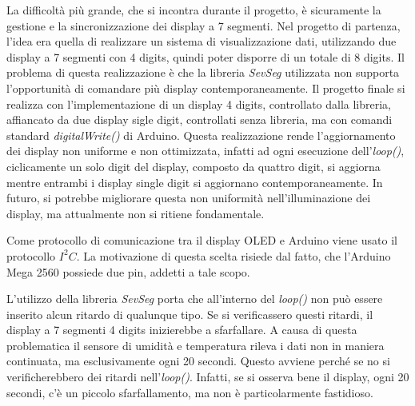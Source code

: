 \documentclass[paper=a4, fontsize=10pt]{scrartcl}
\begin{document}
La difficoltà più grande, che si incontra durante il progetto, è sicuramente la gestione e la sincronizzazione dei display a 7 segmenti. Nel progetto di partenza, l'idea era quella di realizzare un sistema di visualizzazione dati, utilizzando due display a 7 segmenti con 4 digits, quindi poter disporre di un totale di 8 digits. Il problema di questa realizzazione è che la libreria \textit{SevSeg} utilizzata non supporta l'opportunità di comandare più display contemporaneamente. Il progetto finale si realizza con l'implementazione di un display 4 digits, controllato dalla libreria, affiancato da due display sigle digit, controllati senza libreria, ma con comandi standard \textit{digitalWrite()} di Arduino. Questa realizzazione rende l'aggiornamento dei display non uniforme e non ottimizzata, infatti ad ogni esecuzione dell'\textit{loop()}, ciclicamente un solo digit del display, composto da quattro digit, si aggiorna mentre entrambi i display single digit si aggiornano contemporaneamente. In futuro, si potrebbe migliorare questa non uniformità nell'illuminazione dei display, ma attualmente non si ritiene fondamentale.

Come protocollo di comunicazione tra il display OLED e Arduino viene usato il protocollo $I^{2}C$. La motivazione di questa scelta risiede dal fatto, che l'Arduino Mega 2560 possiede due pin, addetti a tale scopo.

L'utilizzo della libreria \textit{SevSeg} porta che all'interno del \textit{loop()} non può essere inserito alcun ritardo di qualunque tipo. Se si verificassero questi ritardi, il display a 7 segmenti 4 digits inizierebbe a sfarfallare. A causa di questa problematica il sensore di umidità e temperatura rileva i dati non in maniera continuata, ma esclusivamente ogni 20 secondi. Questo avviene perché se no si verificherebbero dei ritardi nell'\textit{loop()}. Infatti, se si osserva bene il display, ogni 20 secondi, c'è un piccolo sfarfallamento, ma non è particolarmente fastidioso.
\end{document}
